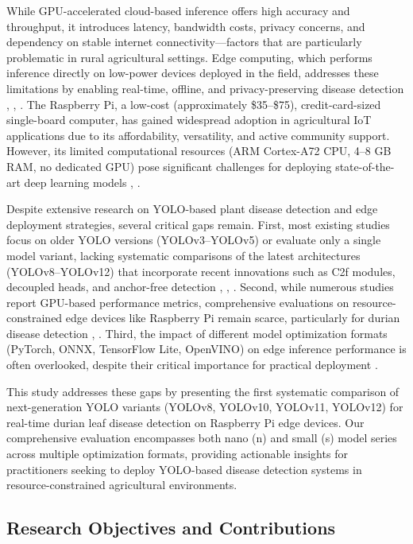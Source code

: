 While GPU-accelerated cloud-based inference offers high accuracy and throughput, it introduces latency, bandwidth costs, privacy concerns, and dependency on stable internet connectivity—factors that are particularly problematic in rural agricultural settings. Edge computing, which performs inference directly on low-power devices deployed in the field, addresses these limitations by enabling real-time, offline, and privacy-preserving disease detection \cite{44}, \cite{47}, \cite{49}. The Raspberry Pi, a low-cost (approximately \$35--\$75), credit-card-sized single-board computer, has gained widespread adoption in agricultural IoT applications due to its affordability, versatility, and active community support. However, its limited computational resources (ARM Cortex-A72 CPU, 4--8 GB RAM, no dedicated GPU) pose significant challenges for deploying state-of-the-art deep learning models \cite{22}, \cite{42}.

Despite extensive research on YOLO-based plant disease detection and edge deployment strategies, several critical gaps remain. First, most existing studies focus on older YOLO versions (YOLOv3--YOLOv5) or evaluate only a single model variant, lacking systematic comparisons of the latest architectures (YOLOv8--YOLOv12) that incorporate recent innovations such as C2f modules, decoupled heads, and anchor-free detection \cite{4}, \cite{14}, \cite{25}. Second, while numerous studies report GPU-based performance metrics, comprehensive evaluations on resource-constrained edge devices like Raspberry Pi remain scarce, particularly for durian disease detection \cite{19}, \cite{48}. Third, the impact of different model optimization formats (PyTorch, ONNX, TensorFlow Lite, OpenVINO) on edge inference performance is often overlooked, despite their critical importance for practical deployment \cite{47}.

This study addresses these gaps by presenting the first systematic comparison of next-generation YOLO variants (YOLOv8, YOLOv10, YOLOv11, YOLOv12) for real-time durian leaf disease detection on Raspberry Pi edge devices. Our comprehensive evaluation encompasses both nano (n) and small (s) model series across multiple optimization formats, providing actionable insights for practitioners seeking to deploy YOLO-based disease detection systems in resource-constrained agricultural environments.

\subsection{Research Objectives and Contributions}

